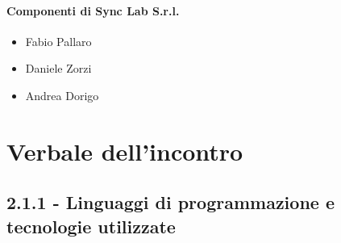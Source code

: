 \documentclass[italian,12pt]{article} %
\begin{document}
\paragraph{Componenti di Sync Lab S.r.l.}

\begin{itemize}
	\item Fabio Pallaro
	\item Daniele Zorzi
	\item Andrea Dorigo
\end{itemize}

\newpage

\section{Verbale dell'incontro}
\subsection*{2.1.1 - Linguaggi di programmazione e tecnologie utilizzate}
\end{document}
